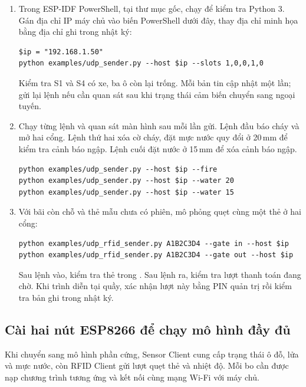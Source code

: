 \begin{enumerate}
\item Trong ESP-IDF PowerShell, tại thư mục gốc, chạy  để kiểm tra Python 3. Gán địa chỉ IP máy chủ vào biến PowerShell dưới đây, thay địa chỉ minh họa bằng địa chỉ ghi trong nhật ký:
\begin{lstlisting}[style=shell]
$ip = "192.168.1.50"
python examples/udp_sender.py --host $ip --slots 1,0,0,1,0
\end{lstlisting}
Kiểm tra S1 và S4 có xe, ba ô còn lại trống. Mỗi bản tin cập nhật một lần; gửi lại lệnh nếu cần quan sát sau khi trạng thái cảm biến chuyển sang ngoại tuyến.
\item Chạy từng lệnh và quan sát màn hình sau mỗi lần gửi. Lệnh đầu báo cháy và mở hai cổng. Lệnh thứ hai xóa cờ cháy, đặt mực nước quy đổi ở 20\,mm để kiểm tra cảnh báo ngập. Lệnh cuối đặt nước ở 15\,mm để xóa cảnh báo ngập.
\begin{lstlisting}[style=shell]
python examples/udp_sender.py --host $ip --fire
python examples/udp_sender.py --host $ip --water 20
python examples/udp_sender.py --host $ip --water 15
\end{lstlisting}
\item Với bãi còn chỗ và thẻ mẫu chưa có phiên, mô phỏng quẹt cùng một thẻ ở hai cổng:
\begin{lstlisting}[style=shell]
python examples/udp_rfid_sender.py A1B2C3D4 --gate in --host $ip
python examples/udp_rfid_sender.py A1B2C3D4 --gate out --host $ip
\end{lstlisting}
Sau lệnh vào, kiểm tra thẻ trong . Sau lệnh ra, kiểm tra lượt thanh toán đang chờ. Khi trình diễn tại quầy, xác nhận lượt này bằng PIN quản trị rồi kiểm tra bản ghi  trong nhật ký.
\end{enumerate}

\subsection{Cài hai nút ESP8266 để chạy mô hình đầy đủ}
Khi chuyển sang mô hình phần cứng, Sensor Client cung cấp trạng thái ô đỗ, lửa và mực nước, còn RFID Client gửi lượt quẹt thẻ và nhiệt độ. Mỗi bo cần được nạp chương trình tương ứng và kết nối cùng mạng Wi-Fi với máy chủ.

